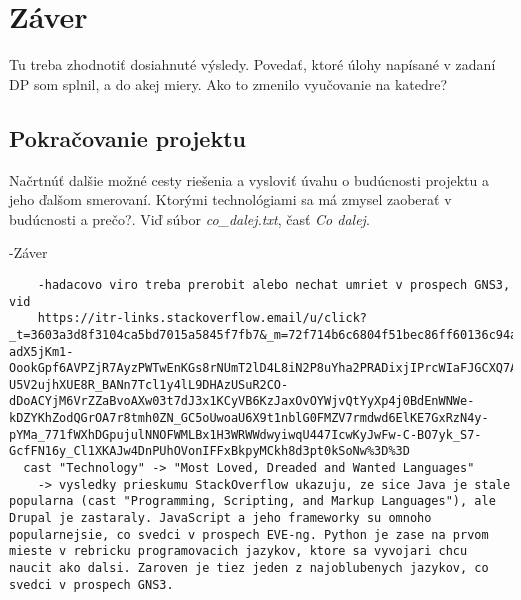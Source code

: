 \chapter{Záver}

Tu treba zhodnotiť dosiahnuté výsledy. Povedať, ktoré úlohy napísané v zadaní DP som splnil, a do akej miery. Ako to zmenilo vyučovanie na katedre?

\section{Pokračovanie projektu}

Načrtnúť dalšie možné cesty riešenia a vysloviť úvahu o budúcnosti projektu a jeho ďalšom smerovaní. Ktorými technológiami sa má zmysel zaoberať v budúcnosti a prečo?. Viď súbor \emph{co\_dalej.txt}, časť \emph{Co dalej}.

-Záver

\begin{verbatim}
    -hadacovo viro treba prerobit alebo nechat umriet v prospech GNS3, vid
    https://itr-links.stackoverflow.email/u/click?_t=3603a3d8f3104ca5bd7015a5845f7fb7&_m=72f714b6c6804f51bec86ff60136c94a&_e=khSYWjE_zs7-adX5jKm1-OookGpf6AVPZjR7AyzPWTwEnKGs8rNUmT2lD4L8iN2P8uYha2PRADixjIPrcWIaFJGCXQ7AyX0cYfKArrRAGqP2_o0jr270rA-U5V2ujhXUE8R_BANn7Tcl1y4lL9DHAzUSuR2CO-dDoACYjM6VrZZaBvoAXw03t7dJ3x1KCyVB6KzJaxOvOYWjvQtYyXp4j0BdEnWNWe-kDZYKhZodQGrOA7r8tmh0ZN_GC5oUwoaU6X9t1nblG0FMZV7rmdwd6ElKE7GxRzN4y-pYMa_771fWXhDGpujulNNOFWMLBx1H3WRWWdwyiwqU447IcwKyJwFw-C-BO7yk_S7-GcfFN16y_Cl1XKAJw4DnPUhOVonIFFxBkpyMCkh8d3pt0kSoNw%3D%3D
  cast "Technology" -> "Most Loved, Dreaded and Wanted Languages"
    -> vysledky prieskumu StackOverflow ukazuju, ze sice Java je stale popularna (cast "Programming, Scripting, and Markup Languages"), ale Drupal je zastaraly. JavaScript a jeho frameworky su omnoho popularnejsie, co svedci v prospech EVE-ng. Python je zase na prvom mieste v rebricku programovacich jazykov, ktore sa vyvojari chcu naucit ako dalsi. Zaroven je tiez jeden z najoblubenych jazykov, co svedci v prospech GNS3.
\end{verbatim}